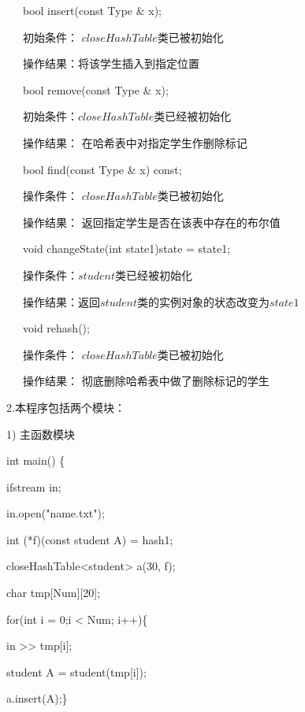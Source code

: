 \documentclass[paper=a4,UTF8,fontsize=11pt]{scrartcl} %
\numberwithin{equation}{section} %
\numberwithin{figure}{section} %
\numberwithin{table}{section} %
\begin{document}
\qquad \qquad \quad \ \ \ bool insert(const Type \& x);

\qquad \qquad \quad \ \ \ 初始条件：	$closeHashTable$类已被初始化

\qquad \qquad \quad \ \ \ 操作结果：将该学生插入到指定位置

\qquad \qquad \quad \ \ \    bool remove(const Type \& x);

\qquad \qquad \quad \ \ \ 初始条件：$closeHashTable$类已经被初始化

\qquad \qquad \quad \ \ \ 操作结果： 在哈希表中对指定学生作删除标记

\qquad \qquad \quad \ \ \     bool find(const Type \& x) const;

\qquad \qquad \quad \ \ \  操作条件： $closeHashTable$类已被初始化

\qquad \qquad \quad \ \ \ 操作结果： 返回指定学生是否在该表中存在的布尔值

\qquad \qquad \quad \ \ \ void changeState(int state1){state = state1;}

\qquad \qquad \quad \ \ \ 操作条件：$student$类已经被初始化 

\qquad \qquad \quad \ \ \ 操作结果：返回$student$类的实例对象的状态改变为$state1$

\qquad \qquad \quad \ \ \ void rehash();

\qquad \qquad \quad \ \ \ 操作条件： $closeHashTable$类已被初始化 

\qquad \qquad \quad \ \ \ 操作结果： 彻底删除哈希表中做了删除标记的学生

\vspace{0.3cm}

2.本程序包括两个模块：

1)  主函数模块

\qquad int main() \{

    \qquad \quad ifstream in;
    
    \qquad \quad in.open("name.txt");
    
    \qquad \quad int (*f)(const student A) = hash1;
    
    \qquad \quad closeHashTable<student> a(30, f);
    
    \qquad \quad char tmp[Num][20];
    
    \qquad \quad for(int i = 0;i < Num; i++)\{
    
    \qquad \quad in >> tmp[i];
        
    \qquad \quad student A = student(tmp[i]);
        
    \qquad \quad a.insert(A);\} 
    
\end{document}

